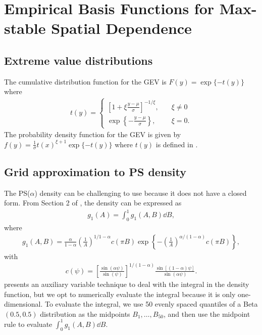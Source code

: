 \chapter{Empirical Basis Functions for Max-stable Spatial Dependence}

\section{Extreme value distributions} \label{eba:GEV}
The cumulative distribution function for the GEV is $F(y) = \exp\{-t(y)\}$ where
\begin{align} \label{ebeq:gevt}
  t(y) = \left\{ \begin{array}{ll}
      \left[1 + \xi \displaystyle \frac{y - \mu}{\sigma}\right]^{-1 / \xi}, \quad &\xi \neq 0 \\ [0.5em]
      \exp\left\{- \displaystyle \frac{y - \mu}{\sigma}\right\}, &\xi = 0.
  \end{array}\right.
\end{align}
The probability density function for the GEV is given by $f(y) = \frac{1}{\sigma} t(x)^{\xi + 1} \exp\{-t(y)\}$ where $t(y)$ is defined in .

\section{Grid approximation to PS density} \label{eba:gridapprox}
The PS($\alpha$) density can be challenging to use because it does not have a closed form.
From Section 2 of \citep{Stephenson2009}, the density can be expressed as
\begin{align}
  g_1(A) = \int_0^1 g_1(A, B) \dd B,
\end{align}
where
\begin{align}
  g_1(A, B) = \frac{\alpha}{1 - \alpha} \left( \frac{1}{A} \right)^{1 / 1 - \alpha} c(\pi B) \exp \left\{ -\left(\frac{1}{A}\right)^{\alpha / (1 - \alpha)} c(\pi B) \right\},
\end{align}
with
\begin{align}
  c(\psi) = \left[\frac{\sin(\alpha \psi)}{\sin(\psi)}\right]^{1 / (1 - \alpha)} \frac{\sin[(1 - \alpha) \psi]}{\sin(\alpha \psi)}.
\end{align}
 presents an auxiliary variable technique to deal with the integral in the density function, but we opt to numerically evaluate the integral because it is only one-dimensional.
To evaluate the integral, we use 50 evenly spaced quantiles of a Beta$(0.5, 0.5)$ distribution as the midpoints $B_1, \ldots, B_{50}$, and then use the midpoint rule to evaluate $\displaystyle \int_0^1 g_1(A, B) \dd B$.

